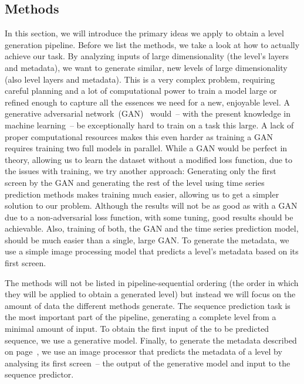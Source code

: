 \subsection{Methods}

In this section, we will introduce the primary ideas we apply to
obtain a level generation pipeline. Before we list the methods, we
take a look at how to actually achieve our task. By analyzing inputs
of large dimensionality (the level's layers and metadata), we want to
generate similar, new levels of large dimensionality (also level
layers and metadata). This is a very complex problem, requiring
careful planning and a lot of computational power to train a model
large or refined enough to capture all the essences we need for a new,
enjoyable level. A generative adversarial network~(GAN)~\cite{} would~-- with
the present knowledge in machine learning~-- be exceptionally hard to
train on a task this large. A lack of proper computational resources
makes this even harder as training a GAN requires training two full
models in parallel. While a GAN would be perfect in theory, allowing
us to learn the dataset without a modified loss function, due to the
issues with training, we try another approach: Generating only the
first screen by the GAN and generating the rest of the level using
time series prediction methods makes training much easier, allowing us
to get a simpler solution to our problem. Although the results will
not be as good as with a GAN due to a non-adversarial loss function,
with some tuning, good results should be achievable. Also, training of
both, the GAN and the time series prediction model, should be much
easier than a single, large GAN. To generate the metadata, we use a
simple image processing model that predicts a level's metadata based
on its first screen.

The methods will not be listed in pipeline-sequential ordering (the
order in which they will be applied to obtain a generated level) but
instead we will focus on the amount of data the different methods
generate. The sequence prediction task is the most important part of
the pipeline, generating a complete level from a minimal amount of
input. To obtain the first input of the to be predicted sequence, we
use a generative model. Finally, to generate the metadata described on
page~\pageref{par:metadata}, we use an image processor that predicts
the metadata of a level by analysing its first screen~-- the output of
the generative model and input to the sequence predictor.

